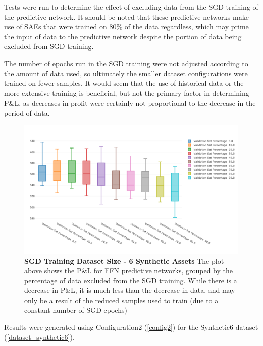 \documentclass[a4paper,11pt,oneside]{article}
\theoremstyle{plain}
\theoremstyle{definition}
\begin{document}
Tests were run to determine the effect of excluding data from the SGD training of the predictive network. It should be noted that these predictive networks make use of SAEs that were trained on 80\% of the data regardless, which may prime the input of data to the predictive network despite the portion of data being excluded from SGD training. \newline

The number of epochs run in the SGD training were not adjusted according to the amount of data used, so ultimately the smaller dataset configurations were trained on fewer samples. It would seem that the use of historical data or the more extensive training is beneficial, but not the primary factor in determining P\&L, as decreases in profit were certainly not proportional to the decrease in the period of data.

\begin{figure}[H]
	\centering \includegraphics[scale=0.3]{images/iteration_three/it3_validationset.png}
	\caption{\textbf{SGD Training Dataset Size - 6 Synthetic Assets} \newline The plot above shows the P\&L for FFN predictive networks, grouped by the percentage of data excluded from the SGD training. While there is a decrease in P\&L, it is much less than the decrease in data, and may only be a result of the reduced samples used to train (due to a constant number of SGD epochs)}
	\label{figure-results_it3_validationset}
\end{figure}

Results were generated using Configuration2 (\ref{config2}) for the Synthetic6 dataset (\ref{dataset_synthetic6}). 

\newline
{}\newline
\end{document}
